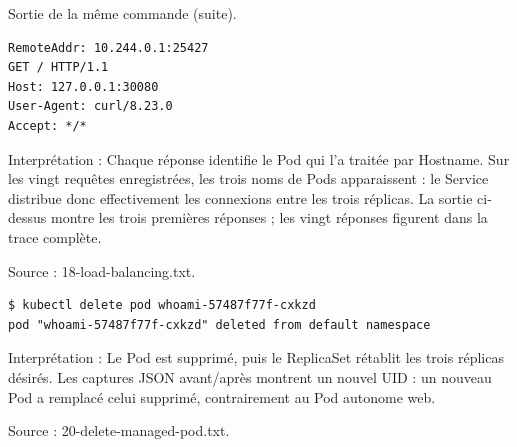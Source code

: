 \documentclass[11pt,a4paper]{article}
\begin{document}
\par\medskip\noindent\begin{minipage}{\linewidth}
Sortie de la même commande (suite).

\par\vspace{4pt}\noindent\begin{minipage}{\linewidth}
\begin{Verbatim}[breaklines=true,breakanywhere=true,fontsize=\footnotesize,frame=single,framesep=8pt,rulecolor=\color{teal}]
RemoteAddr: 10.244.0.1:25427
GET / HTTP/1.1
Host: 127.0.0.1:30080
User-Agent: curl/8.23.0
Accept: */*
\end{Verbatim}
\end{minipage}\par\vspace{6pt}

Interprétation : Chaque réponse identifie le Pod qui l'a traitée par Hostname. Sur les vingt requêtes enregistrées, les trois noms de Pods apparaissent : le Service distribue donc effectivement les connexions entre les trois réplicas. La sortie ci-dessus montre les trois premières réponses ; les vingt réponses figurent dans la trace complète.

{\footnotesize\color{teal} Source : 18-load-balancing.txt.\par}
\end{minipage}\par\medskip

\par\medskip\noindent\begin{minipage}{\linewidth}
\par\vspace{4pt}\noindent\begin{minipage}{\linewidth}
\begin{Verbatim}[breaklines=true,breakanywhere=true,fontsize=\footnotesize,frame=single,framesep=8pt,rulecolor=\color{teal}]
$ kubectl delete pod whoami-57487f77f-cxkzd
pod "whoami-57487f77f-cxkzd" deleted from default namespace
\end{Verbatim}
\end{minipage}\par\vspace{6pt}

Interprétation : Le Pod est supprimé, puis le ReplicaSet rétablit les trois réplicas désirés. Les captures JSON avant/après montrent un nouvel UID : un nouveau Pod a remplacé celui supprimé, contrairement au Pod autonome web.

{\footnotesize\color{teal} Source : 20-delete-managed-pod.txt.\par}
\end{minipage}\par\medskip
\end{document}
